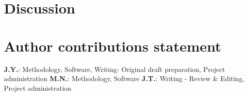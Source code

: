 \documentclass[fleqn,10pt]{wlscirep}
\begin{document}

\section*{Discussion}
  \label{disc}






\section*{Author contributions statement}
\textbf{J.Y.}: Methodology, Software, Writing- Original draft preparation, Project administration
\textbf{M.N.}: Methodology, Software
\textbf{J.T.}: Writing - Review \& Editing, Project administration
\end{document}
